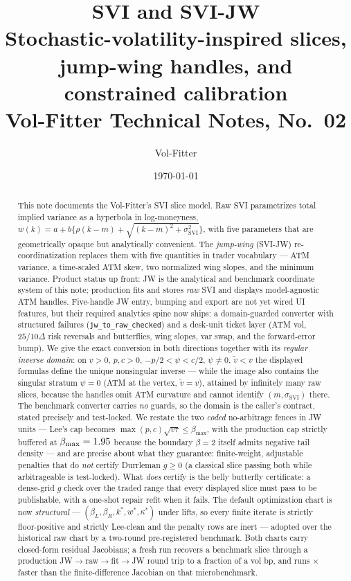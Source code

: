 \documentclass[11pt]{article}
\title{\textbf{SVI and SVI-JW}\\[2pt]
\large Stochastic-volatility-inspired slices, jump-wing handles, and constrained calibration\\[2pt]
\normalsize Vol-Fitter Technical Notes, No.~02}
\author{Vol-Fitter}
\date{\today}
\begin{document}
\maketitle

\newcommand{\sigsvi}{\sigma_{\mathrm{SVI}}}

\begin{abstract}
This note documents the Vol-Fitter's SVI slice model. Raw SVI parametrizes total
implied variance as a hyperbola in log-moneyness,
$w(k)=a+b\{\rho(k-m)+\sqrt{(k-m)^2+\sigsvi^2}\}$, with five parameters that are
geometrically opaque but analytically convenient. The \emph{jump-wing} (SVI-JW)
re-coordinatization replaces them with five quantities in trader vocabulary ---
ATM variance, a time-scaled ATM skew, two normalized wing slopes, and the
minimum variance. Product status up front: JW is the analytical and benchmark
coordinate system of this note; production fits and stores \emph{raw} SVI and
displays model-agnostic ATM handles. Five-handle JW entry, bumping and export
are not yet wired UI features, but their required analytics spine now ships:
a domain-guarded converter with structured failures
(\texttt{jw\_to\_raw\_checked}) and a desk-unit ticket layer (ATM vol,
$25/10\Delta$ risk reversals and butterflies, wing slopes, var swap, and the
forward-error bump). We give the exact conversion in both directions together
with its \emph{regular inverse domain}: on $v>0$, $p,c>0$, $-p/2<\psi<c/2$,
$\psi\ne0$, $\widetilde v<v$ the displayed formulas define the unique
nonsingular inverse --- while the image also contains the singular stratum
$\psi=0$ (ATM at the vertex, $\widetilde v=v$), attained by infinitely many
raw slices, because the handles omit ATM curvature and cannot identify
$(m,\sigsvi)$ there. The benchmark converter carries \emph{no} guards, so the
domain is the caller's contract, stated precisely and test-locked. We restate
the two \emph{coded} no-arbitrage fences in JW units --- Lee's cap becomes
$\max(p,c)\sqrt{v\tau}\le\beta_{\max}$, with the production cap strictly
buffered at $\beta_{\max}=1.95$ because the boundary $\beta=2$ itself
admits negative tail density --- and are precise about what they guarantee:
finite-weight, adjustable penalties that do \emph{not} certify Durrleman
$g\ge0$ (a classical slice passing both while arbitrageable is test-locked).
What \emph{does} certify is the belly butterfly certificate: a dense-grid $g$
check over the traded range that every displayed slice must pass to be
publishable, with a one-shot repair refit when it fails. The default
optimization chart is now \emph{structural} ---
$(\beta_L,\beta_R,k^*,w^*,\kappa^*)$ under lifts, so every finite iterate is
strictly floor-positive and strictly Lee-clean and the penalty rows are inert
--- adopted over the historical raw chart by a two-round pre-registered
benchmark. Both charts carry closed-form residual Jacobians; a fresh run
recovers a benchmark slice through a production JW$\to$raw$\to$fit$\to$JW
round trip to a fraction of a vol bp, and runs \svispeedup$\times$ faster
than the finite-difference Jacobian on that microbenchmark.
\end{abstract}
\end{document}
